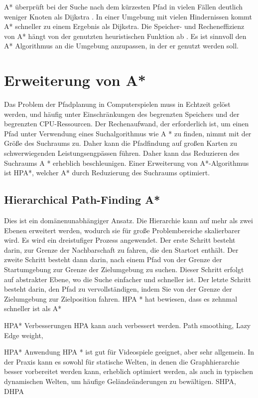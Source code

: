 A* überprüft bei der Suche nach dem kürzesten Pfad in vielen Fällen deutlich weniger Knoten als Dijkstra \cite{Krishnaswamy.2009}. In einer Umgebung mit vielen Hindernissen kommt A* schneller zu einem Ergebnis als Dijkstra. Die Speicher- und Recheneffizienz von A* hängt von der genutzten heuristischen Funktion ab \cite{Noori.2015}. Es ist sinnvoll den A* Algorithmus an die Umgebung anzupassen, in der er genutzt werden soll.

\section{Erweiterung von A*}
Das Problem der Pfadplanung in Computerspielen muss in Echtzeit gelöst werden, und  häufig unter Einschränkungen des begrenzten Speichers und der begrenzten CPU-Ressourcen. Der Rechenaufwand, der erforderlich ist, um einen Pfad unter Verwendung eines Suchalgorithmus wie A * zu finden, nimmt mit der Größe des Suchraums zu. Daher kann die Pfadfindung auf großen Karten zu schwerwiegenden Leistungsengpässen führen. Daher kann das Reduzieren des Suchraums A * erheblich beschleunigen. Einer Erweiterung von A*-Algorithmus ist HPA*, welcher A* durch Reduzierung des Suchraums optimiert\cite{hpa}. %

\subsection{Hierarchical Path-Finding A*}
Dies ist ein domänenunabhängiger Ansatz. Die Hierarchie kann auf mehr als zwei Ebenen erweitert werden, wodurch sie für große Problembereiche skalierbarer wird. Es wird ein dreistufiger Prozess angewendet. Der erste Schritt besteht darin, zur Grenze der Nachbarschaft zu fahren, die den Startort enthält. Der zweite Schritt besteht dann darin, nach einem Pfad von der Grenze der Startumgebung zur Grenze der Zielumgebung zu suchen. Dieser Schritt erfolgt auf abstrakter Ebene, wo die Suche einfacher und schneller ist. Der letzte Schritt besteht darin, den Pfad zu vervollständigen, indem Sie von der Grenze der Zielumgebung zur Zielposition fahren. HPA * hat bewiesen, dass es zehnmal schneller ist als A*\cite{hpa}

HPA* Verbesserungen
HPA kann auch verbessert werden. Path smoothing, Lazy Edge weight,

HPA* Anwendung%
HPA * ist gut für Videospiele geeignet, aber sehr allgemein. In der Praxis kann es sowohl für statische Welten, in denen die Graphhierarchie besser vorbereitet werden kann, erheblich optimiert werden, als auch in typischen dynamischen Welten, um häufige Geländeänderungen zu bewältigen. 
SHPA, 
DHPA



